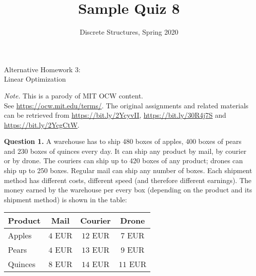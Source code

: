 \documentclass[jou]{apa6}
\title{Sample Quiz 8}
\author{Discrete Structures, Spring 2020}
\affiliation{RBS}
\begin{document}
\twocolumn
\thispagestyle{empty}

\begin{center}
{\Large Alternative Homework 3:}\\
{\Large Linear Optimization}
\end{center}

\begin{changemargin}{10pt}{10pt}
{\footnotesize
{\em Note.} This is a parody of MIT OCW content.\\
See \url{https://ocw.mit.edu/terms/}. 
The original assignments and related materials can be retrieved from 
\url{https://bit.ly/2YcyvII}, \url{https://bit.ly/30R4j7S} and 
\url{https://bit.ly/2YcgCtW}.
}
\end{changemargin}








\vspace{4pt}
{\bf Question 1.} A warehouse has to ship 480 boxes of apples, 400 boxes of pears and 230 boxes
of quinces every day. 
It can ship any product by mail, by courier or by drone. 
The couriers can ship up to 420 boxes of any product; drones can ship up to 250 boxes. Regular mail can ship any number of boxes. 
Each shipment method has different costs, different speed (and therefore \textendash{} different earnings). 
The money earned by the warehouse per every box (depending on the product and its shipment method) is shown in the table:

\vspace{4pt}
\begin{tabular}{|l|c|c|c|} \hline
Product & Mail & Courier & Drone \\ \hline
Apples & $4$ EUR & $12$ EUR & $7$ EUR \\ \hline
Pears & $4$ EUR & $13$ EUR & $9$ EUR \\ \hline
Quinces & $8$ EUR & $14$ EUR & $11$ EUR \\ \hline
\end{tabular}
\end{document}
